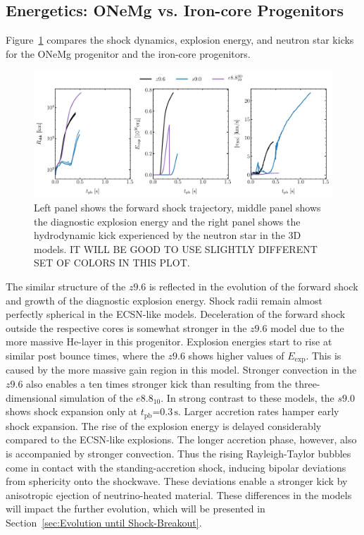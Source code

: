 \documentclass[fleqn,usenatbib]{mnras}
\newcommand{\tpb}{\ensuremath{t_{\text{pb}}}}
\renewcommand{\sec}{\xspace\ensuremath{\text{s}}}
\newcommand{\NY}[2]{{\color{blue}\sout{#1}#2}}
\begin{document}
\subsection{Energetics: ONeMg vs. Iron-core Progenitors}
Figure~\ref{fig:eexp kick 3D} compares the shock dynamics, explosion energy, and neutron star kicks for the ONeMg progenitor and the iron-core progenitors.
\begin{figure}
 \centering
 \includegraphics[width=\textwidth]{pic/eexp_shk_kick_all_1d2d3d.pdf}
 \caption{Left panel shows the forward shock trajectory, middle panel shows the diagnostic explosion energy and the right panel shows the hydrodynamic kick experienced by the neutron star in the 3D models. \NY{}{IT WILL BE GOOD TO USE SLIGHTLY DIFFERENT SET OF COLORS IN THIS PLOT.}}
\label{fig:eexp kick 3D} 
\end{figure}
The similar structure of the $z9.6$ is reflected in the evolution of the forward shock and growth of the diagnostic explosion energy. Shock radii remain almost perfectly spherical in the ECSN-like models. Deceleration of the forward shock outside the respective cores is somewhat stronger in the $z9.6$ model due to the more massive He-layer in this progenitor. Explosion energies start to rise at similar post bounce times, where the $z9.6$ shows higher values of $E_{\mathrm{exp}}$. This is caused by the more massive gain region in this model. 
Stronger convection in the $z9.6$ also enables a ten times stronger kick than resulting from the three-dimensional simulation of the $e8.8_{10}$.
In strong contrast to these models, the $s9.0$ shows shock expansion only at $\tpb\mathord{=}0.3\,\sec$. Larger accretion rates hamper early shock expansion. The rise of the explosion energy is delayed considerably compared to the ECSN-like explosions. The longer accretion phase, however, also is accompanied by stronger convection. Thus the rising Rayleigh-Taylor bubbles come in contact with the standing-accretion shock, inducing bipolar deviations from sphericity onto the shockwave. These deviations enable a stronger kick by anisotropic ejection of neutrino-heated material. 
These differences in the models will impact the further evolution, which will be presented in Section~\ref{sec:Evolution until Shock-Breakout}.
\end{document}
